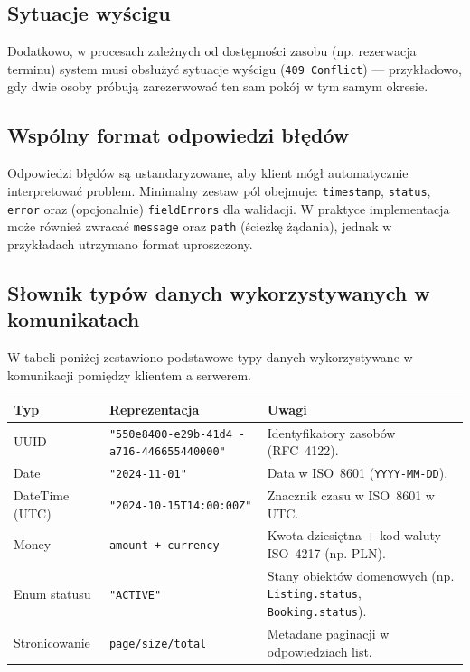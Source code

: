 \documentclass[11pt, a4paper]{article}
\begin{document}
\subsection{Sytuacje wyścigu}
Dodatkowo, w procesach zależnych od dostępności zasobu (np. rezerwacja terminu)
system musi obsłużyć sytuacje wyścigu (\texttt{409 Conflict}) --- przykładowo, gdy dwie osoby próbują zarezerwować ten sam pokój w tym samym okresie.

\subsection{Wspólny format odpowiedzi błędów}
\label{sec:CommonErrs}
Odpowiedzi błędów są ustandaryzowane, aby klient mógł automatycznie interpretować problem. Minimalny zestaw pól obejmuje:
\texttt{timestamp}, \texttt{status}, \texttt{error} oraz (opcjonalnie) \texttt{fieldErrors} dla walidacji. W praktyce implementacja może również zwracać
\texttt{message} oraz \texttt{path} (ścieżkę żądania), jednak w przykładach utrzymano format uproszczony.

\subsection{Słownik typów danych wykorzystywanych w komunikatach}
W tabeli poniżej zestawiono podstawowe typy danych wykorzystywane w komunikacji pomiędzy klientem a serwerem.

\begin{longtable}{|p{3cm}|p{5cm}|p{7cm}|}
\hline
\textbf{Typ} & \textbf{Reprezentacja} & \textbf{Uwagi} \\ \hline
UUID & \texttt{"550e8400-e29b-41d4
-a716-446655440000"} & Identyfikatory zasobów (RFC~4122). \\ \hline
Date & \texttt{"2024-11-01"} & Data w ISO~8601 (\texttt{YYYY-MM-DD}). \\ \hline
DateTime (UTC) & \texttt{"2024-10-15T14:00:00Z"} & Znacznik czasu w ISO~8601 w UTC. \\ \hline
Money & \texttt{amount + currency} & Kwota dziesiętna + kod waluty ISO~4217 (np. PLN). \\ \hline
Enum statusu & \texttt{"ACTIVE"} & Stany obiektów domenowych (np. \texttt{Listing.status}, \texttt{Booking.status}). \\ \hline
Stronicowanie & \texttt{page/size/total} & Metadane paginacji w odpowiedziach list. \\ \hline
\end{longtable}
\end{document}
